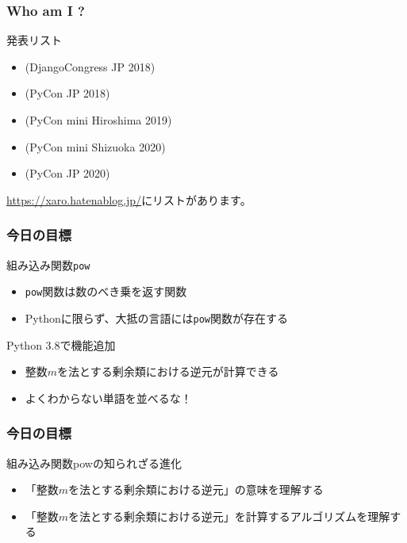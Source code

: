 \documentclass[aspectratio=169,dvipdfmx,14pt,notheorems]{beamer}
\theoremstyle{definition}
\begin{document}
\begin{frame}\frametitle{Who am I ?}

\begin{block}{発表リスト}
\begin{itemize}
\item {}(DjangoCongress JP 2018)
\item {}(PyCon JP 2018)
\item {}(PyCon mini Hiroshima 2019)
\item {}(PyCon mini Shizuoka 2020)
\item {}(PyCon JP 2020)
\end{itemize}
\end{block}
\url{https://xaro.hatenablog.jp/}にリストがあります。
\end{frame}

\begin{frame}\frametitle{今日の目標}

\begin{block}{組み込み関数\texttt{pow}}
\begin{itemize}
\item \texttt{pow}関数は数のべき乗を返す関数
\item Pythonに限らず、大抵の言語には\texttt{pow}関数が存在する
\end{itemize}
\end{block}

\begin{exampleblock}{Python 3.8で機能追加}
\begin{itemize}
\item 整数$m$を法とする剰余類における逆元が計算できる
\item よくわからない単語を並べるな！
\end{itemize}
\end{exampleblock}
\end{frame}

\begin{frame}\frametitle{今日の目標}
\begin{block}{組み込み関数powの知られざる進化}
\begin{itemize}
\item 「整数$m$を法とする剰余類における逆元」の意味を理解する
\item 「整数$m$を法とする剰余類における逆元」を計算するアルゴリズムを理解する
\end{itemize}
\end{block}
\end{frame}
\end{document}
